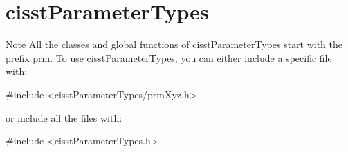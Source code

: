 \hypertarget{group__cisst_parameter_types}{}\section{cisst\+Parameter\+Types}
\label{group__cisst_parameter_types}
\begin{DoxyNote}{Note}
All the classes and global functions of cisst\+Parameter\+Types start with the prefix prm. To use cisst\+Parameter\+Types, you can either include a specific file with\+: 
\begin{DoxyCode}
\textcolor{preprocessor}{#include <cisstParameterTypes/prmXyz.h>}
\end{DoxyCode}
 or include all the files with\+: 
\begin{DoxyCode}
\textcolor{preprocessor}{#include <cisstParameterTypes.h>}
\end{DoxyCode}
 
\end{DoxyNote}
